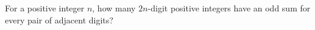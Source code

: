 For a positive integer $n$, how many $2n$-digit positive integers have an odd sum for every pair of adjacent digits?
